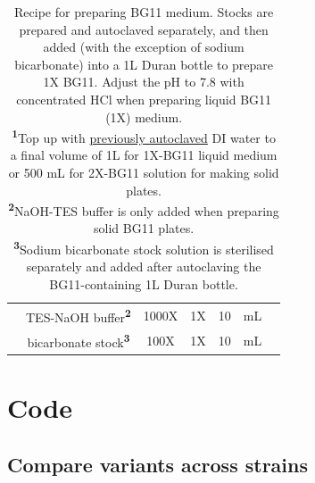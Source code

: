 \documentclass[12pt]{article}
\begin{document}
\begin{table}[H]
\begin{tabular}{c|ccccc|c}
                                                                                                     & TES-NaOH buffer\textsuperscript{\textbf{2}} & 1000X                                 & 1X                                      & 10                                   & mL             &  
    \\                                                                                                 
                                                                                                    & bicarbonate stock\textsuperscript{\textbf{3}}                                                            & 100X                                  & 1X                                      & 10                                   & mL             &                                                                                                                                      \\ \hline
                                                                                                     
                                                                                                     
    \end{tabular}
    \caption[Recipe for preparing BG11 medium]{Recipe for preparing BG11 medium. Stocks are prepared and autoclaved separately, and then added (with the exception of sodium bicarbonate) into a 1L Duran bottle to prepare 1X BG11. Adjust the pH to 7.8 with concentrated HCl when preparing liquid BG11 (1X) medium.\\ \textsuperscript{\textbf{1}}Top up with \ul{previously autoclaved} DI water to a final volume of 1L for 1X-BG11 liquid medium or 500 mL for 2X-BG11 solution for making solid plates.\\ \textsuperscript{\textbf{2}}NaOH-TES buffer is only added when preparing solid BG11 plates. \\ \textsuperscript{\textbf{3}}Sodium bicarbonate stock solution is sterilised separately and added after autoclaving the BG11-containing 1L Duran bottle.}
    \label{Tab:BG11rec}
    
\end{table}

\section{Code}

\subsection{Compare variants across strains}
\end{document}
